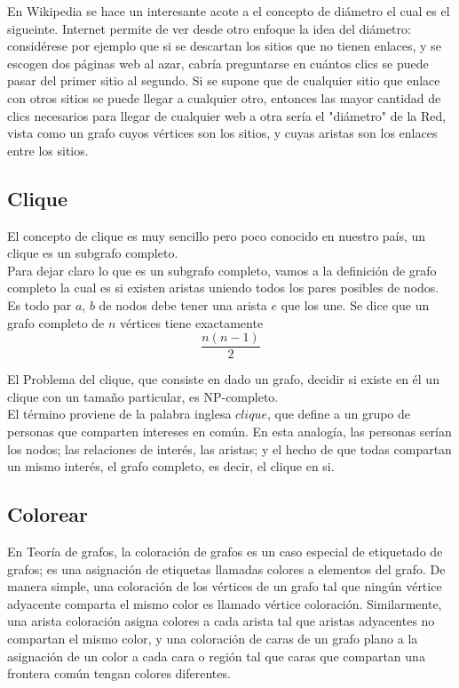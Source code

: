 \documentclass[10pt,a4paper]{article}
\begin{document}
 En Wikipedia se hace un interesante acote a el concepto de diámetro el cual es el sigueinte. Internet permite de ver desde otro enfoque la idea del diámetro: considérese por ejemplo que si se descartan los sitios que no tienen enlaces, y se escogen dos páginas web al azar, cabría preguntarse en cuántos clics se puede pasar del primer sitio al segundo. Si se supone que de cualquier sitio que enlace con otros sitios se puede llegar a cualquier otro, entonces las mayor cantidad de clics necesarios para llegar de cualquier web a otra sería el "diámetro" de la Red, vista como un grafo cuyos vértices son los sitios, y cuyas aristas son los enlaces entre los sitios.\\ 
\subsection{Clique}
El concepto de clique es muy sencillo pero poco conocido en nuestro país, un clique es un subgrafo completo.\\
Para dejar claro lo que es un subgrafo completo, vamos a la definición de grafo completo la cual es si existen aristas uniendo todos los pares posibles de nodos. Es todo par $a$, $b$ de nodos debe tener una arista $e$ que los une.
Se dice que un grafo completo de $n$ vértices tiene exactamente 
\begin{equation}
\frac{n(n-1)}{2}
\end{equation}
	
	El Problema del clique, que consiste en dado un grafo, decidir si existe en él un clique con un tamaño particular, es NP-completo.\cite{Clique}\\
	
	
	El término proviene de la palabra inglesa $clique$, que define a un grupo de personas que comparten intereses en común. En esta analogía, las personas serían los nodos; las relaciones de interés, las aristas; y el hecho de que todas compartan un mismo interés, el grafo completo, es decir, el clique en si.
\subsection{Colorear}
	En Teoría de grafos, la coloración de grafos es un caso especial de etiquetado de grafos; es una asignación de etiquetas llamadas colores a elementos del grafo. De manera simple, una coloración de los vértices de un grafo tal que ningún vértice adyacente comparta el mismo color es llamado vértice coloración. Similarmente, una arista coloración asigna colores a cada arista tal que aristas adyacentes no compartan el mismo color, y una coloración de caras de un grafo plano a la asignación de un color a cada cara o región tal que caras que compartan una frontera común tengan colores diferentes.\cite{Coloracion}\\
\end{document}
